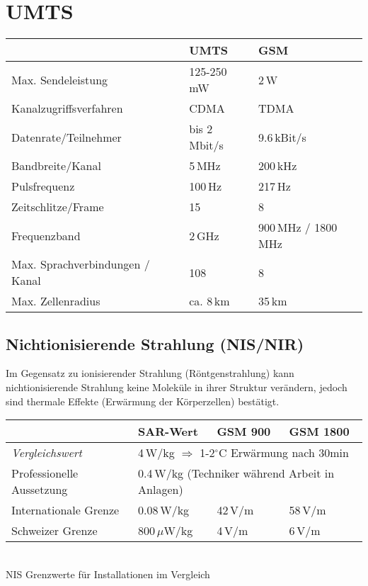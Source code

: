 \section{UMTS }
    \begin{tabular}{|l|l|l|}
        \hline
        
        & \textbf{UMTS}
        & \textbf{GSM}\\
        \hline
        Max. Sendeleistung
        & 125-250\,mW
        & 2\,W \\
        \hline
        Kanalzugriffsverfahren
        & CDMA
        & TDMA \\
        \hline
        Datenrate/Teilnehmer
        & bis 2\,Mbit/s 
        & 9.6\,kBit/s \\
        \hline
        Bandbreite/Kanal
        & 5\,MHz
        & 200\,kHz \\
        \hline
        Pulsfrequenz
        & 100\,Hz
        & 217\,Hz \\
        \hline
        Zeitschlitze/Frame
        & 15
        & 8 \\
        \hline
        Frequenzband
        & 2\,GHz
        & 900\,MHz / 1800\,MHz \\
        \hline
        Max. Sprachverbindungen / Kanal
        & 108
        & 8 \\
        \hline
        Max. Zellenradius
        & ca. 8\,km
        & 35\,km \\
        \hline
    \end{tabular}

\subsection{Nichtionisierende Strahlung (NIS/NIR) }
Im Gegensatz zu ionisierender Strahlung (Röntgenstrahlung) kann nichtionisierende Strahlung keine Moleküle 
in ihrer Struktur verändern, jedoch sind thermale Effekte (Erwärmung der Körperzellen) bestätigt.

\begin{center}
\begin{tabular}{|l|l|l|l|} \hline
    & SAR-Wert
    & GSM 900
    & GSM 1800 \\
    \hline    
        \textit{Vergleichswert}
        & \multicolumn{3}{l|}{4\,W/kg $\Rightarrow$ 1-2$^\circ$C Erwärmung nach 30min} \\       
    \hline    
    Professionelle Aussetzung  
        & \multicolumn{3}{l|}{0.4\,W/kg (Techniker während Arbeit in Anlagen)} \\      
    \hline
    Internationale Grenze  
        & 0.08\,W/kg
        & 42\,V/m
        & 58\,V/m \\
    \hline
    Schweizer Grenze 
        & 800\,$\mu$W/kg
        & 4\,V/m
        & 6\,V/m \\
	\hline
	\end{tabular} \\
	NIS Grenzwerte für Installationen im Vergleich
	\end{center}

